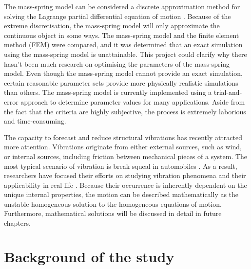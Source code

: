 The mass-spring model can be considered a discrete approximation method for solving the Lagrange partial differential equation of motion \cite{baleanu2020new}. Because of the extreme discretisation, the mass-spring model will only approximate the continuous object in some ways. The mass-spring model and the finite element method (FEM) \cite{duan2014volume} were compared, and it was determined that an exact simulation using the mass-spring model is unattainable. This project could clarify why there hasn't been much research on optimising the parameters of the mass-spring model. Even though the mass-spring model cannot provide an exact simulation, certain reasonable parameter sets provide more physically realistic simulations than others. The mass-spring model is currently implemented using a trial-and-error approach to determine parameter values for many applications. Aside from the fact that the criteria are highly subjective, the process is extremely laborious and time-consuming.

The capacity to forecast and reduce structural vibrations has recently attracted more attention. Vibrations originate from either external sources, such as wind, or internal sources, including friction between mechanical pieces of a system. The most typical scenario of vibration is break squeal in automobiles \cite{suggs1969application}. As a result, researchers have focused their efforts on studying vibration phenomena and their applicability in real life \cite{levitan1960forced} \cite{pellicer2004analysis} \cite{grandmont2006viscoelastic}. Because their occurrence is inherently dependent on the unique internal properties, the motion can be described mathematically as the unstable homogeneous solution to the homogeneous equations of motion. Furthermore, mathematical solutions will be discussed in detail in future chapters. 

\section{Background of the study}
\label{sec:1.1}

\paragraph{}

